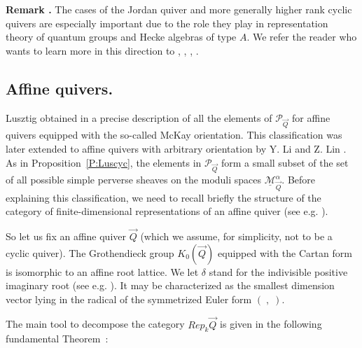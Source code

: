\documentclass[a4paper,10pt]{amsart}
\def\Ma{\underline{\mathcal{M}}^{\alpha}_{\vec{Q}}}
\numberwithin{equation}{section}
\begin{document}
\vspace{.2in}

\addtocounter{theo}{1}
\noindent \textbf{Remark \thetheo .} The cases of the Jordan quiver and more generally higher rank cyclic quivers are especially important due to the role they play in representation theory of quantum groups and Hecke algebras of type $A$. We refer the reader who wants to learn more in this direction to \cite{GV}, \cite{V}, \cite{VV}, \cite{Quiversurvey}.

\vspace{.3in}

\subsection{Affine quivers.}

\vspace{.15in}

Lusztig obtained in \cite{Lusaff} a precise description of all the elements of $\mathcal{P}_{\vec{Q}}$ for affine quivers equipped with the so-called McKay orientation. This classification was later extended to affine quivers with arbitrary orientation by Y. Li and Z. Lin \cite{LZ}. As in Proposition~\ref{P:Luscyc}, the elements in $\mathcal{P}_{\vec{Q}}$ form a small subset of the set of all possible simple perverse sheaves on the moduli spaces $\Ma$. Before explaining this classification, we need to recall briefly the structure of the category of finite-dimensional representations of an affine quiver (see e.g. \cite[Section~3.6.]{Trieste} ). 

\vspace{.1in}

So let us fix an affine quiver $\vec{Q}$ (which we assume, for simplicity, not to be a cyclic quiver). The Grothendieck group $K_0(\vec{Q})$ equipped with the Cartan form is isomorphic to an affine root lattice. We let 
$\delta$ stand for the indivisible positive imaginary root (see e.g. \cite[App. A] {Trieste}). It may be characterized as the smallest dimension vector lying in the radical of the symmetrized Euler form $(\;,\;)$.

\vspace{.1in}

The main tool to decompose the category $Rep_{k} \vec{Q}$ is given in the following fundamental Theorem~:

\vspace{.1in}
\end{document}
